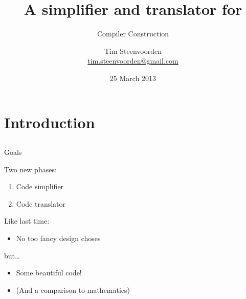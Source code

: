 

  {}
  {}



\subtitle {Compiler Construction}
\title    {A simplifier and translator for \SPL}
\author   [Tim Steenvoorden]
          {Tim Steenvoorden\\
           \medskip
           {\small \url{tim.steenvoorden@gmail.com}}}%
\date     {25 March 2013}

\begin{frame}
  \titlepage
\end{frame}


\section{Introduction}
\subsection*{}

\begin{frame}{Goals}

  Two new phases:

  \begin{enumerate}
    \item Code simplifier
    \item Code translator
  \end{enumerate}

  \pause

  Like last time:

  \begin{itemize}
    \item No too fancy design choses
  \end{itemize}

  but\ldots
  \pause

  \begin{itemize}
    \item Some beautiful code!
    \item (And a comparison to mathematics)
  \end{itemize}

\end{frame}

